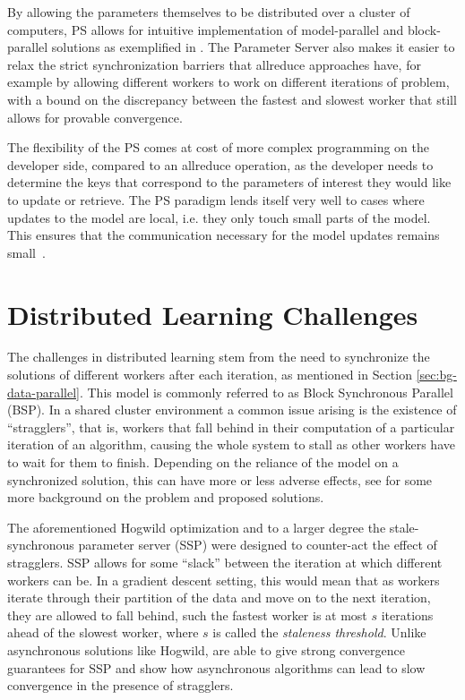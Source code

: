 By allowing the parameters themselves to be
distributed over a cluster of computers, PS allows for intuitive implementation of
model-parallel and block-parallel solutions as exemplified in \cite{muPS, lightLDA}.
The Parameter Server also makes it easier to relax the strict synchronization
barriers that allreduce approaches have, for example by allowing different workers
to work on different iterations of problem, with a bound on the discrepancy between
the fastest and slowest worker that still allows for provable convergence\cite{stale-sync-ps}.

The flexibility of the PS comes at cost of more complex programming on the developer
side, compared to an allreduce operation, as the developer needs to determine the
keys that correspond to the parameters of interest they would like to update or
retrieve. The PS paradigm lends itself very well to cases where updates to the model
are local, i.e. they only touch small parts of the model. This ensures that the communication
necessary for the model updates remains small~\cite{muPS}.

\section{Distributed Learning Challenges}
\label{sec:bg-ml-challenges}

The challenges in distributed learning stem from the need to synchronize the solutions of different workers
after each iteration,
as mentioned in Section \ref{sec:bg-data-parallel}. This model is commonly referred to as
Block Synchronous Parallel (BSP).
In a shared cluster environment a common issue arising is the existence of ``stragglers'', that is,
workers that fall behind in their computation of a particular iteration of an algorithm, causing
the whole system to stall as other workers have to wait for them to finish. Depending on the reliance
of the model on a synchronized solution, this can have more or less adverse effects, see
\cite{straggler-ml} for some more background on the problem and proposed solutions.

The aforementioned Hogwild optimization \cite{hogwild} and to a larger degree the stale-synchronous
parameter server (SSP) \cite{stale-sync-ps} were designed to counter-act the effect of stragglers.
SSP allows for some ``slack'' between the iteration at which different workers can be. In a gradient
descent setting, this would mean that as workers iterate through their partition of the data and move
on to the next iteration, they are allowed to fall behind, such the fastest worker is at most
$s$ iterations ahead of the slowest worker, where $s$ is called the \emph{staleness threshold}.
Unlike asynchronous solutions like Hogwild, \citet{stale-sync-ps} are able to give strong convergence
guarantees for SSP and show how asynchronous algorithms can lead to slow convergence in the presence of stragglers.


